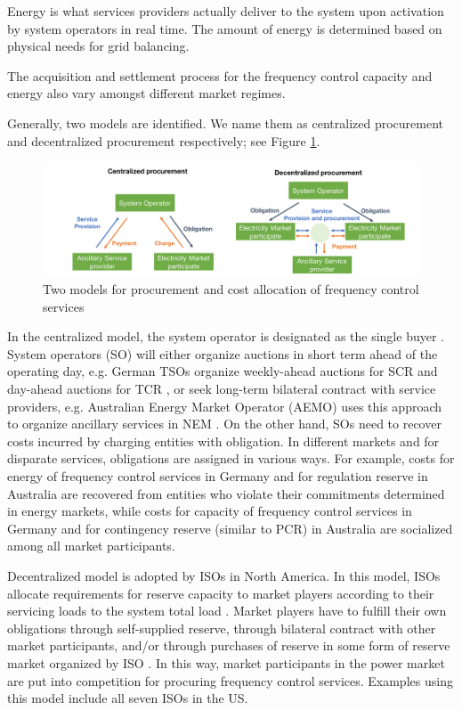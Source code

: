 Energy is what services providers actually deliver to the system upon activation by system operators in real time. The amount of energy is determined based on physical needs for grid balancing.

The acquisition and settlement process for the frequency control capacity and energy also vary amongst different market regimes.

Generally, two models are identified. We name them as centralized procurement and decentralized procurement respectively; see Figure \ref{fig:FCR_market-model}.

\begin{figure}[h!]
	\centering
	\includegraphics[width=1.05\linewidth]{Figures/FCR_market_model}
	\caption{Two models for procurement and cost allocation of frequency control services}
	\label{fig:FCR_market-model}
\end{figure}

In the centralized model, the system operator is designated as the single buyer \cite{Rebours2009}. System operators (SO) will either organize auctions in short term ahead of the operating day, e.g. German TSOs organize weekly-ahead auctions for SCR and day-ahead auctions for TCR \cite{ConsentecGmbH2014}, or seek long-term bilateral contract with service providers, e.g. Australian Energy Market Operator (AEMO) uses this approach to organize ancillary services in NEM \cite{AEMO2015}. On the other hand, SOs need to recover costs incurred by charging entities with obligation. In different markets and for disparate services, obligations are assigned in various ways. For example, costs for energy of frequency control services in Germany and for regulation reserve in Australia are recovered from entities who violate their commitments determined in energy markets, while costs for capacity of frequency control services in Germany and for contingency reserve (similar to PCR) in Australia are socialized among all market participants. 

Decentralized model is adopted by ISOs in North America. In this model, ISOs allocate requirements for reserve capacity to market players according to their servicing loads to the system total load \cite{Rebours2009,EllisonJ.F.TesfatsionL.S.LooseV.W.Byrne2012,PJM2017b}. Market players have to fulfill their own obligations through self-supplied reserve, through bilateral contract with other market participants, and/or through purchases of reserve in some form of reserve market organized by ISO \cite{EllisonJ.F.TesfatsionL.S.LooseV.W.Byrne2012}. In this way, market participants in the power market are put into competition for procuring frequency control services. Examples using this model include all seven ISOs in the US.

